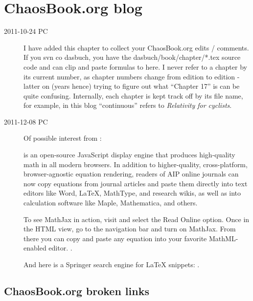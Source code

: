 
\chapter{ChaosBook.org blog}
\label{chap:ChaosBook}

\renewcommand{\ssp}{x}

\begin{description}

\item[2011-10-24 PC]
I have added this chapter to collect your ChaosBook.org edits /
comments. If you svn co dasbuch, you have the dasbuch/book/chapter/*.tex
source code and can clip and paste formulas to here. I never refer to a
chapter by its current number, as chapter numbers change from edition to
edition - latter on (years hence) trying to figure out what ``Chapter
17'' is can be quite confusing. Internally, each chapter is kept track
off by its file name, for example, in this blog ``continuous'' refers to
 {\em Relativity for cyclists}.

\item[2011-12-08 PC] Of possible interest from
:

 is an open-source JavaScript
display engine that produces high-quality math in all modern browsers. In
addition to higher-quality, cross-platform, browser-agnostic equation
rendering, readers of AIP online journals can now copy equations from
journal articles and paste them directly into text editors like Word,
LaTeX, MathType, and research wikis, as well as into calculation software
like Maple, Mathematica, and others.

To see MathJax in action, visit
 and select the Read Online option. Once in the
HTML view, go to the navigation bar and turn on MathJax. From there you
can copy and paste any equation into your favorite MathML-enabled editor.
.

And here is a Springer search engine for LaTeX snippets:
.

\end{description}

\section{ChaosBook.org broken links}
\label{c-brokenLinks}


